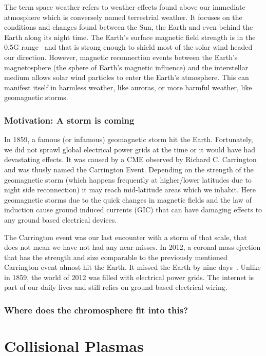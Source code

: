 \documentclass[12pt,upcase]{umlthesis}
\begin{document}
The term space weather refers to weather effects found above our immediate atmosphere which is conversely named terrestrial weather. It focuses on the conditions and changes found between the Sun, the Earth and even behind the Earth along its night time. The Earth's surface magnetic field strength is in the 0.5G range~\citep{Finlay2010} and that is strong enough to shield most of the solar wind headed our direction. However, magnetic reconnection events between the Earth's magnetosphere (the sphere of Earth's magnetic influence) and the interstellar medium allows solar wind particles to enter the Earth's atmosphere. This can manifest itself in harmless weather, like auroras, or more harmful weather, like geomagnetic storms.

\subsection{Motivation: A storm is coming}

In 1859, a famous (or infamous) geomagnetic storm hit the Earth. Fortunately, we did not sprawl global electrical power grids at the time or it would have had devastating effects. It was caused by a CME observed by Richard C. Carrington and was thusly named the Carrington Event. Depending on the strength of the geomagnetic storm (which happens frequently at higher/lower latitudes due to night side reconnection) it may reach mid-latitude areas which we inhabit. Here geomagnetic storms due to the quick changes in magnetic fields and the law of induction cause ground induced currents (GIC) that can have damaging effects to any ground based electrical devices.

The Carrington event was our last encounter with a storm of that scale, that does not mean we have not had any near misses. In 2012, a coronal mass ejection that has the strength and size comparable to the previously mentioned Carrington event almost hit the Earth. It missed the Earth by nine days~\citep{Baker2013}. Unlike in 1859, the world of 2012 was filled with electrical power grids. The internet is part of our daily lives and still relies on ground based electrical wiring.



\subsection{Where does the chromosphere fit into this?}

\chapter{Collisional Plasmas}
\end{document}
